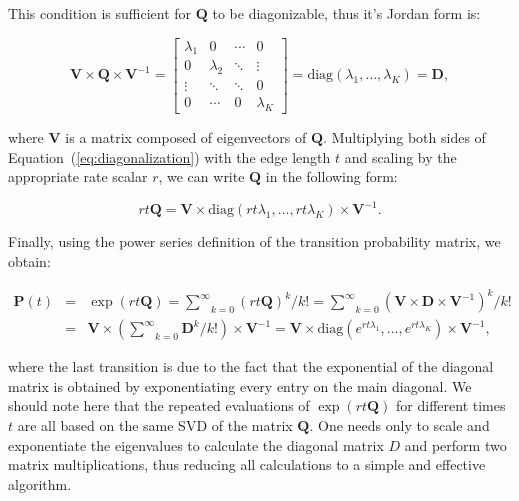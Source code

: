 \noindent
This condition is sufficient for $\mathbf{Q}$ to be diagonizable, thus it's Jordan form is:

\begin{equation}
\mathbf{V}\times\mathbf{Q}\times\mathbf{V}^{-1}=\left[\begin{array}{cccc}
\lambda_{1} & 0 & \cdots & 0\\
0 & \lambda_{2} & \ddots & \vdots\\
\vdots & \ddots & \ddots & 0\\
0 & \cdots & 0 & \lambda_{K}
\end{array}\right]=\text{diag}(\lambda_{1},\ldots,\lambda_{K})=\mathbf{D} ,
\label{eq:diagonalization}
\end{equation}

\noindent where $\mathbf{V}$ is a matrix composed of eigenvectors of $\mathbf{Q}$. 
Multiplying both sides of Equation~(\ref{eq:diagonalization}) with the edge length $t$ and scaling by the appropriate rate scalar $r$, we can write $\mathbf{Q}$ in the following form:

\begin{equation}
rt\mathbf{Q}=\mathbf{V}\times\text{diag}(rt\lambda_{1},\ldots,rt\lambda_{K})\times\mathbf{V}^{-1} .
\end{equation}

\noindent Finally, using the power series definition of the transition probability matrix, we obtain: 

\begin{eqnarray}
\mathbf{P}(t) & = & \exp\left(rt\mathbf{Q}\right)  =  \underset{k=0}{\overset{\infty}{\sum}}\left(rt\mathbf{Q}\right)^{k}/k! 
 =  \underset{k=0}{\overset{\infty}{\sum}}\left(\mathbf{V}\times\mathbf{D}\times\mathbf{V}^{-1}\right)^{k}/k! \\ \nonumber
& = & \mathbf{V}\times\left(\underset{k=0}{\overset{\infty}{\sum}}\mathbf{D}^{k}/k!\right)\times\mathbf{V}^{-1} = \mathbf{V}\times\text{diag}(e^{rt\lambda_{1}},\ldots,e^{rt\lambda_{K}})\times\mathbf{V}^{-1} ,
\label{eq:eigen_decomposition}
\end{eqnarray}

\noindent 
where the last transition is due to the fact that the exponential of the diagonal matrix is obtained by exponentiating every entry on the main diagonal.
We should note here that the repeated evaluations of $\exp\left(rt\mathbf{Q}\right)$ for different times $t$ are all based on the same SVD of the matrix $\mathbf{Q}$. 
One needs only to scale and exponentiate the eigenvalues to calculate the diagonal matrix $D$ and perform two matrix multiplications, thus reducing all calculations to a simple and effective algorithm. 

